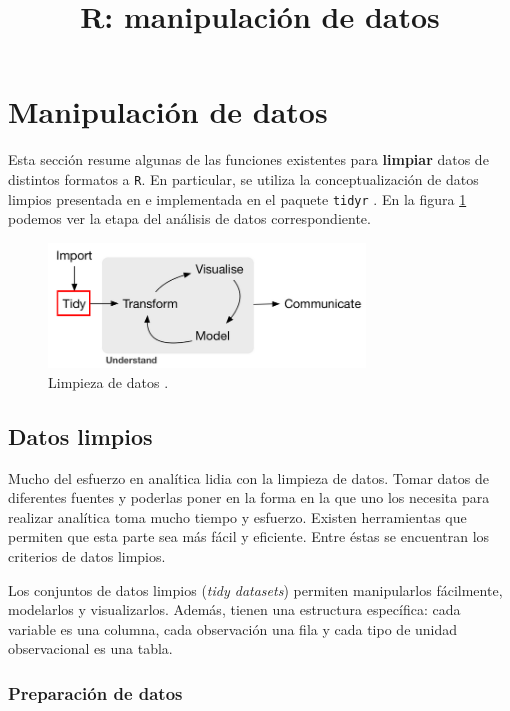 \documentclass[]{article}
\title{R: manipulación de datos}
\author{}
\date{}
\begin{document}
\maketitle

\section{Manipulación de datos}\label{manipulacion-de-datos}

Esta sección resume algunas de las funciones existentes para
\textbf{limpiar} datos de distintos formatos a \texttt{R}. En
particular, se utiliza la conceptualización de datos limpios presentada
en \textcite{wickham2014tidy} e implementada en el paquete
\texttt{tidyr} \parencite{tidyr}. En la figura \ref{fig:ciclo2} podemos
ver la etapa del análisis de datos correspondiente.

\begin{figure}[h]
    \centering
    \includegraphics[width=0.75\textwidth]{../img/02_ciclo_2.png}
    \caption{Limpieza de datos \textcite[Introducción]{grolemund2016r}.}
    \label{fig:ciclo2}
\end{figure}

\subsection{Datos limpios}\label{datos-limpios}

Mucho del esfuerzo en analítica lidia con la limpieza de datos. Tomar
datos de diferentes fuentes y poderlas poner en la forma en la que uno
los necesita para realizar analítica toma mucho tiempo y esfuerzo.
Existen herramientas que permiten que esta parte sea más fácil y
eficiente. Entre éstas se encuentran los criterios de datos limpios.

Los conjuntos de datos limpios (\emph{tidy datasets}) permiten
manipularlos fácilmente, modelarlos y visualizarlos. Además, tienen una
estructura específica: cada variable es una columna, cada observación
una fila y cada tipo de unidad observacional es una tabla.

\subsubsection{Preparación de datos}\label{preparacion-de-datos}
\end{document}
